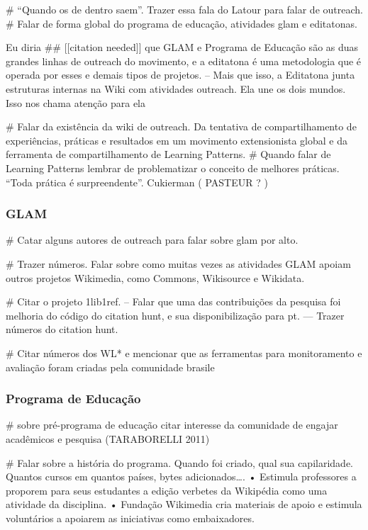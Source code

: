 # “Quando os de dentro saem”. Trazer essa fala do Latour para falar de outreach.
# Falar de forma global do programa de educação, atividades glam e editatonas.

Eu diria ## [[citation needed]] que GLAM e Programa de Educação são as duas grandes linhas de outreach do movimento, e a editatona é uma metodologia que é operada por esses e demais tipos de projetos.
-- Mais que isso, a Editatona junta estruturas internas na Wiki com atividades outreach. Ela une os dois mundos. Isso nos chama atenção para ela

# Falar da existência da wiki de outreach. Da tentativa de compartilhamento de experiências, práticas e resultados em um movimento extensionista global e da ferramenta de compartilhamento de Learning Patterns.
# Quando falar de Learning Patterns lembrar de problematizar o conceito de melhores práticas. “Toda prática é surpreendente”. Cukierman ( PASTEUR ? )

\subsubsection{GLAM}

# Catar alguns autores de outreach para falar sobre glam por alto.

# Trazer números. Falar sobre como muitas vezes as atividades GLAM apoiam outros projetos Wikimedia, como Commons, Wikisource e Wikidata.

# Citar o projeto 1lib1ref.
-- Falar que uma das contribuições da pesquisa foi melhoria do código do citation hunt, e sua disponibilização para pt.
--- Trazer números do citation hunt.

# Citar números dos WL* e mencionar que as ferramentas para monitoramento e avaliação foram criadas pela comunidade brasile

\subsubsection{Programa de Educação}

# sobre pré-programa de educação citar interesse da comunidade de engajar acadêmicos e pesquisa (TARABORELLI 2011)

# Falar sobre a história do programa. Quando foi criado, qual sua capilaridade. Quantos cursos em quantos países, bytes adicionados….
    • Estimula professores a proporem para seus estudantes a edição verbetes da Wikipédia como uma atividade da disciplina.
    • Fundação Wikimedia cria materiais de apoio e estimula voluntários a apoiarem as iniciativas como embaixadores.

